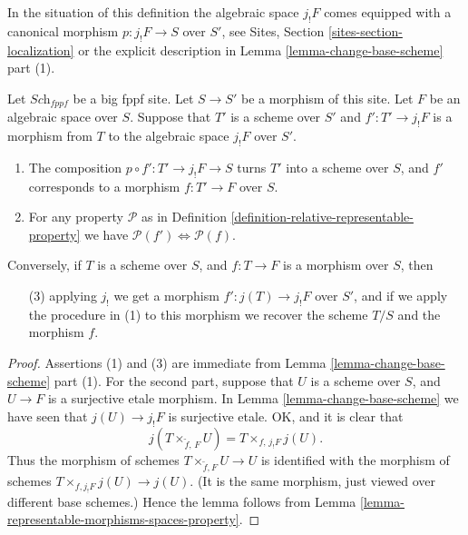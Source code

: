 \noindent
In the situation of this definition the algebraic space $j_!F$
comes equipped with a canonical morphism $p : j_!F \to S$ over $S'$, see
Sites, Section \ref{sites-section-localization}
or the explicit description in
Lemma \ref{lemma-change-base-scheme} part (1).

\begin{lemma}
\label{lemma-viewed-as-properties}
Let $\textit{Sch}_{fppf}$ be a big fppf site.
Let $S \to S'$ be a morphism of this site.
Let $F$ be an algebraic space over $S$.
Suppose that $T'$ is a scheme over $S'$ and $f' : T' \to j_!F$
is a morphism from $T$ to the algebraic space $j_!F$ over $S'$.
\begin{enumerate}
\item The composition $p \circ f' : T' \to j_!F \to S$ turns $T'$
into a scheme over $S$, and $f'$ corresponds to a morphism
$f : T' \to F$ over $S$.
\item For any property $\mathcal{P}$ as in
Definition \ref{definition-relative-representable-property}
we have $\mathcal{P}(f') \Leftrightarrow \mathcal{P}(f)$.
\end{enumerate}
Conversely, if $T$ is a scheme over $S$, and $f : T \to F$
is a morphism over $S$, then
\begin{enumerate}
\item[(3)] applying $j_!$ we get a morphism $f' : j(T) \to j_!F$ over
$S'$, and if we apply the procedure in (1) to this morphism we recover
the scheme $T/S$ and the morphism $f$.
\end{enumerate}
\end{lemma}

\begin{proof}
Assertions (1) and (3) are immediate from Lemma \ref{lemma-change-base-scheme}
part (1). For the second part, suppose that $U$ is a scheme over $S$, and
$U \to F$ is a surjective etale morphism. In
Lemma \ref{lemma-change-base-scheme}
we have seen that $j(U) \to j_!F$ is surjective etale. OK, and it is
clear that
$$
j(T \times_{\tilde f,\, F} U) = T \times_{f,\, j_!F} j(U).
$$
Thus the morphism of schemes $T \times_{\tilde f, F} U \to U$
is identified with the morphism of schemes
$T \times_{f, j_!F} j(U) \to j(U)$.
(It is the same morphism, just viewed over different base schemes.)
Hence the lemma follows from
Lemma \ref{lemma-representable-morphisms-spaces-property}.
\end{proof}

















